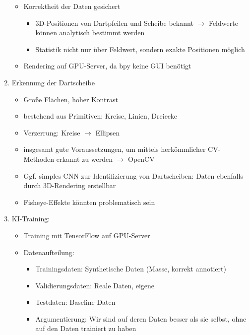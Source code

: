 \begin{enumerate}
\begin{itemize}
        \item Korrektheit der Daten gesichert
        \begin{itemize}
            \item 3D-Positionen von Dartpfeilen und Scheibe bekannt $\rightarrow$ Feldwerte können analytisch bestimmt werden
            \item Statistik nicht nur über Feldwert, sondern exakte Positionen möglich
        \end{itemize}

        \item Rendering auf GPU-Server, da bpy keine GUI benötigt
    \end{itemize}

    \item Erkennung der Dartscheibe
    \begin{itemize}
        \raggedright
        \item Große Flächen, hoher Kontrast
        \item bestehend aus Primitiven: Kreise, Linien, Dreiecke
        \item Verzerrung: Kreise $\rightarrow$ Ellipsen
        \item insgesamt gute Voraussetzungen, um mittels herkömmlicher CV-Methoden erkannt zu werden $\rightarrow$ OpenCV
        \item Ggf. simples CNN zur Identifizierung von Dartscheiben: Daten ebenfalls durch 3D-Rendering erstellbar
        \item Fisheye-Effekte könnten problematisch sein
    \end{itemize}

    \item KI-Training:
    \begin{itemize}
        \item Training mit TensorFlow auf GPU-Server
        \item Datenaufteilung:
        \begin{itemize}
            \item Trainingsdaten: Synthetische Daten (Masse, korrekt annotiert)
            \item Validierungsdaten: Reale Daten, eigene
            \item Testdaten: Baseline-Daten
            \item Argumentierung: Wir sind auf deren Daten besser als sie selbst, ohne auf den Daten trainiert zu haben
        \end{itemize}


\end{itemize}
\end{enumerate}
